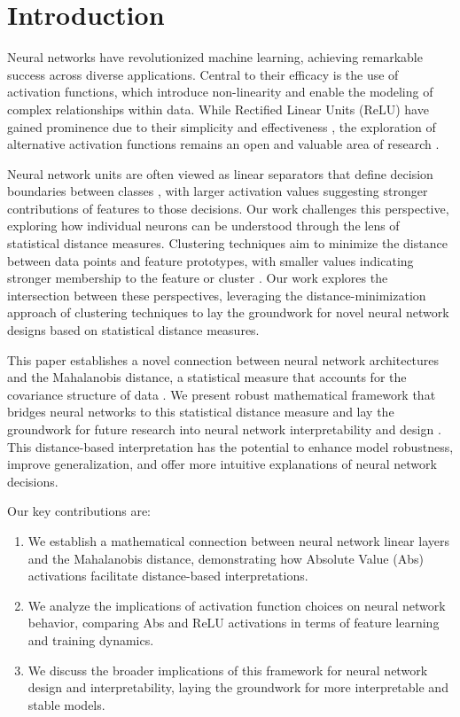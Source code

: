 \section{Introduction}

Neural networks have revolutionized machine learning, achieving remarkable success across diverse applications. Central to their efficacy is the use of activation functions, which introduce non-linearity and enable the modeling of complex relationships within data. While Rectified Linear Units (ReLU) have gained prominence due to their simplicity and effectiveness \citep{nair2010rectified}, the exploration of alternative activation functions remains an open and valuable area of research \citep{ramachandran2017searching}.

Neural network units are often viewed as linear separators that define decision boundaries between classes \citep{minsky1969perceptrons}, with larger activation values suggesting stronger contributions of features to those decisions. Our work challenges this perspective, exploring how individual neurons can be understood through the lens of statistical distance measures. Clustering techniques aim to minimize the distance between data points and feature prototypes, with smaller values indicating stronger membership to the feature or cluster \citep{macqueen1967methods}. Our work explores the intersection between these perspectives, leveraging the distance-minimization approach of clustering techniques to lay the groundwork for novel neural network designs based on statistical distance measures.

This paper establishes a novel connection between neural network architectures and the Mahalanobis distance, a statistical measure that accounts for the covariance structure of data \citep{mahalanobis1936generalized}. We present robust mathematical framework that bridges neural networks to this statistical distance measure and lay the groundwork for future research into neural network interpretability and design \citep{lipton2016mythos}. This distance-based interpretation has the potential to enhance model robustness, improve generalization, and offer more intuitive explanations of neural network decisions.

Our key contributions are:

\begin{enumerate}
    \item We establish a mathematical connection between neural network linear layers and the Mahalanobis distance, demonstrating how Absolute Value (Abs) activations facilitate distance-based interpretations.
    \item We analyze the implications of activation function choices on neural network behavior, comparing Abs and ReLU activations in terms of feature learning and training dynamics.
    \item We discuss the broader implications of this framework for neural network design and interpretability, laying the groundwork for more interpretable and stable models.
\end{enumerate}
